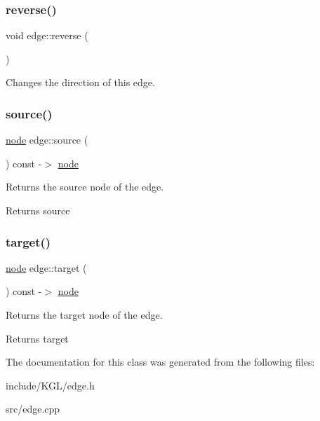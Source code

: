 \subsubsection{\texorpdfstring{reverse()}{reverse()}}
{\footnotesize\ttfamily void edge\+::reverse (\begin{DoxyParamCaption}{ }\end{DoxyParamCaption})}

Changes the direction of this edge. \mbox{\label{classedge_a32b9b7bfa7b337d6646decbc4fe90ac4}} 
\subsubsection{\texorpdfstring{source()}{source()}}
{\footnotesize\ttfamily \mbox{\hyperlink{classnode}{node}} edge\+::source (\begin{DoxyParamCaption}{ }\end{DoxyParamCaption}) const -\/$>$ \mbox{\hyperlink{classnode}{node}}}

Returns the source node of the edge.

\begin{DoxyReturn}{Returns}
source 
\end{DoxyReturn}
\mbox{\label{classedge_ae79f633c9409dd6f8ecf33a344b00fbd}} 
\subsubsection{\texorpdfstring{target()}{target()}}
{\footnotesize\ttfamily \mbox{\hyperlink{classnode}{node}} edge\+::target (\begin{DoxyParamCaption}{ }\end{DoxyParamCaption}) const -\/$>$ \mbox{\hyperlink{classnode}{node}}}

Returns the target node of the edge.

\begin{DoxyReturn}{Returns}
target 
\end{DoxyReturn}


The documentation for this class was generated from the following files\+:\begin{DoxyCompactItemize}
\item 
include/\+K\+G\+L/edge.\+h\item 
src/edge.\+cpp\end{DoxyCompactItemize}
